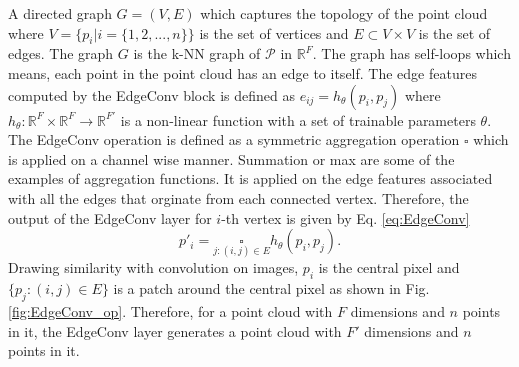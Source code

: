A directed graph $G = (V,E)$ which captures the topology of the point cloud where $V=\{p_i | i = \{1,2,...,n\}\}$ is the set of vertices and $E \subset V \times V$ is the set of edges. The graph $G$ is the \ac{k-NN} graph of $\mathcal{P}$ in $\mathbb{R}^F$. The graph has self-loops which means, each point in the point cloud has an edge to itself. The edge features computed by the EdgeConv block is defined as $e_{ij} = h_{\theta}(p_i, p_j)$ where $h_{\theta}: \mathbb{R}^F \times \mathbb{R}^F \rightarrow \mathbb{R}^{F'}$ is a non-linear function with a set of trainable parameters $\theta$. The EdgeConv operation is defined as a symmetric aggregation operation $\square$ which is applied on a channel wise manner. Summation or max are some of the examples of aggregation functions. It is applied on the edge features associated with all the edges that orginate from each connected vertex. Therefore, the output of the EdgeConv layer for $i$-th vertex is given by Eq. \ref{eq:EdgeConv}
\begin{equation}
    \label{eq:EdgeConv}
    p'_i = \underset{j:(i,j) \in E}{\square} h_{\theta}(p_i, p_j).
\end{equation}
Drawing similarity with convolution on images, $p_i$ is the central pixel and $\{p_j:(i,j) \in E\}$ is a patch around the central pixel as shown in Fig. \ref{fig:EdgeConv_op}. Therefore, for a point cloud with $F$ dimensions and $n$ points in it, the EdgeConv layer generates a point cloud with $F'$ dimensions and $n$ points in it.
